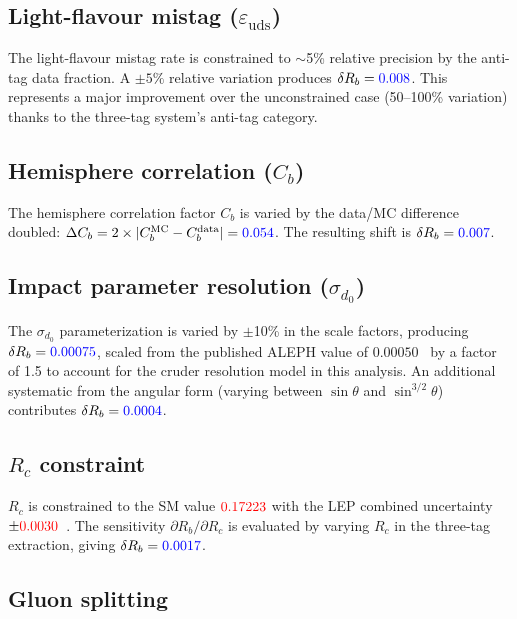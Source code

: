 \documentclass[11pt,a4paper]{article}
\newcommand{\measured}[1]{\textcolor{blue}{#1}}
\newcommand{\external}[1]{\textcolor{red}{#1}}
\begin{document}
\subsection{Light-flavour mistag ($\varepsilon_\mathrm{uds}$)}
\label{sec:syst-epsuds}

The light-flavour mistag rate is constrained to $\sim$5\% relative
precision by the anti-tag data fraction.  A $\pm 5\%$ relative variation
produces $\delta R_b = \measured{0.008}$.  This represents a major
improvement over the unconstrained case (50--100\% variation) thanks to
the three-tag system's anti-tag category.

\subsection{Hemisphere correlation ($C_b$)}
\label{sec:syst-cb}

The hemisphere correlation factor $C_b$ is varied by the data/MC
difference doubled: $\Delta C_b = 2 \times |C_b^\mathrm{MC} -
C_b^\mathrm{data}| = \measured{0.054}$.  The resulting shift is
$\delta R_b = \measured{0.007}$.

\subsection{Impact parameter resolution ($\sigma_{d_0}$)}
\label{sec:syst-sigma-d0}

The $\sigma_{d_0}$ parameterization is varied by $\pm$10\% in the scale
factors, producing $\delta R_b = \measured{0.00075}$, scaled from the
published ALEPH value of $0.00050$~\cite{ALEPH:Rb:1996} by a factor of
1.5 to account for the cruder resolution model in this analysis.  An
additional systematic from the angular form (varying between $\sin\theta$
and $\sin^{3/2}\theta$) contributes $\delta R_b = \measured{0.0004}$.

\subsection{$R_c$ constraint}
\label{sec:syst-rc}

$R_c$ is constrained to the SM value $\external{0.17223}$ with the LEP
combined uncertainty $\pm\external{0.0030}$~\cite{LEP:EWWG:2005}.  The
sensitivity $\partial R_b / \partial R_c$ is evaluated by varying $R_c$
in the three-tag extraction, giving $\delta R_b = \measured{0.0017}$.

\subsection{Gluon splitting}
\label{sec:syst-gluon}
\end{document}
